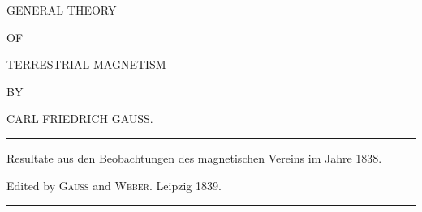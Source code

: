 \clearpage
\thispagestyle{empty}
\begin{center}
\vspace*{1in}
{\Large GENERAL THEORY\par}
\bigskip
OF\par
\bigskip
{\Large TERRESTRIAL MAGNETISM\par}
\vspace{.5in}
{\small BY\par}
\bigskip
CARL FRIEDRICH GAUSS.\par
\vfill
\rule{.8\textwidth}{.3pt}\par
\medskip
{\small Resultate aus den Beobachtungen des magnetischen Vereins im Jahre 1838.\par
Edited by \textsc{Gauss} and \textsc{Weber}. Leipzig 1839.\par}
\medskip
\rule{.8\textwidth}{.3pt}\par
\end{center}
\clearpage
